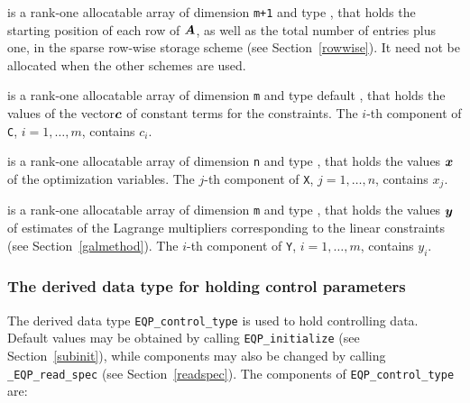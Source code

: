 \documentclass{galahad}
\newcommand{\packagename}{EQP}
\newcommand{\fullpackagename}{\libraryname\_\packagename}
\begin{document}
\begin{description}
\begin{description}
 is a rank-one allocatable array of dimension {\tt m+1} and type 
\integer, that holds the 
starting position of each row of ${\bm{A}}$, as well
as the total number of entries plus one, in the sparse row-wise storage
scheme (see Section~\ref{rowwise}). It need not be allocated when the
other schemes are used.

\end{description}

 is a rank-one allocatable array of dimension {\tt m} and type default 
\realdp, that holds the values of the vector${\bm{c}}$ of constant terms
for the constraints.
The $i$-th component of {\tt C}, $i = 1,  \ldots ,  m$, contains 
$c_{i}$.  

 is a rank-one allocatable array of dimension {\tt n} and type 
\realdp, 
that holds the values ${\bm{x}}$ of the optimization variables.
The $j$-th component of {\tt X}, $j = 1,  \ldots , n$, contains $x_{j}$.  

 is a rank-one allocatable array of dimension {\tt m} and type 
\realdp, that holds
the values ${\bm{y}}$ of estimates  of the Lagrange multipliers
corresponding to the linear constraints (see Section~\ref{galmethod}).
The $i$-th component of {\tt Y}, $i = 1,  \ldots ,  m$, contains $y_{i}$.  

\end{description}


\subsubsection{The derived data type for holding control 
 parameters}\label{typecontrol}
The derived data type 
{\tt \packagename\_control\_type} 
is used to hold controlling data. Default values may be obtained by calling 
{\tt \packagename\_initialize}
(see Section~\ref{subinit}),
while components may also be changed by calling 
{\tt \fullpackagename\_read\-\_spec}
(see Section~\ref{readspec}). 
The components of 
{\tt \packagename\_control\_type} 
are:



\end{document}
